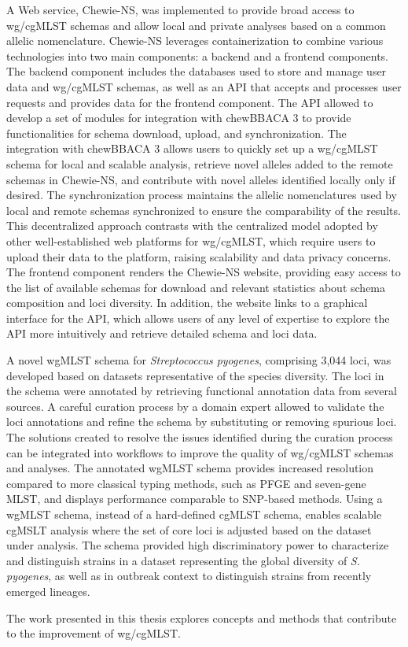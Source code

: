 A Web service, Chewie-NS, was implemented to provide broad access to wg/cgMLST schemas and allow local and private analyses based on a common allelic nomenclature. Chewie-NS leverages containerization to combine various technologies into two main components: a backend and a frontend components. The backend component includes the databases used to store and manage user data and wg/cgMLST schemas, as well as an API that accepts and processes user requests and provides data for the frontend component. The API allowed to develop a set of modules for integration with chewBBACA 3 to provide functionalities for schema download, upload, and synchronization. The integration with chewBBACA 3 allows users to quickly set up a wg/cgMLST schema for local and scalable analysis, retrieve novel alleles added to the remote schemas in Chewie-NS, and contribute with novel alleles identified locally only if desired. The synchronization process maintains the allelic nomenclatures used by local and remote schemas synchronized to ensure the comparability of the results. This decentralized approach contrasts with the centralized model adopted by other well-established web platforms for wg/cgMLST, which require users to upload their data to the platform, raising scalability and data privacy concerns. The frontend component renders the Chewie-NS website, providing easy access to the list of available schemas for download and relevant statistics about schema composition and loci diversity. In addition, the website links to a graphical interface for the API, which allows users of any level of expertise to explore the API more intuitively and retrieve detailed schema and loci data.

A novel wgMLST schema for \textit{Streptococcus pyogenes}, comprising 3,044 loci, was developed based on datasets representative of the species diversity. The loci in the schema were annotated by retrieving functional annotation data from several sources. A careful curation process by a domain expert allowed to validate the loci annotations and refine the schema by substituting or removing spurious loci. The solutions created to resolve the issues identified during the curation process can be integrated into workflows to improve the quality of wg/cgMLST schemas and analyses. The annotated wgMLST schema provides increased resolution compared to more classical typing methods, such as PFGE and seven-gene MLST, and displays performance comparable to SNP-based methods. Using a wgMLST schema, instead of a hard-defined cgMLST schema, enables scalable cgMSLT analysis where the set of core loci is adjusted based on the dataset under analysis. The schema provided high discriminatory power to characterize and distinguish strains in a dataset representing the global diversity of \textit{S. pyogenes}, as well as in outbreak context to distinguish strains from recently emerged lineages.

The work presented in this thesis explores concepts and methods that contribute to the improvement of wg/cgMLST.
